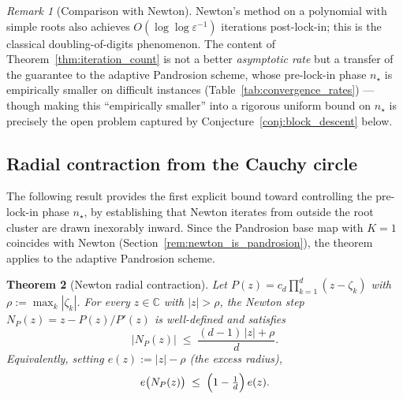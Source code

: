 \documentclass[10pt,a4paper,oneside]{book}
\newtheorem{theorem}{Theorem}[chapter]
\theoremstyle{definition}
\theoremstyle{remark}
\newtheorem{remark}[theorem]{Remark}
\newcommand{\CC}{\mathbb{C}}
\begin{document}
\begin{remark}[Comparison with Newton]
Newton's method on a polynomial with simple roots also achieves $O(\log\log \varepsilon^{-1})$ iterations post-lock-in; this is the classical doubling-of-digits phenomenon.  The content of Theorem~\ref{thm:iteration_count} is not a better \emph{asymptotic rate} but a transfer of the guarantee to the adaptive Pandrosion scheme, whose pre-lock-in phase $n_\star$ is empirically smaller on difficult instances (Table~\ref{tab:convergence_rates}) --- though making this ``empirically smaller'' into a rigorous uniform bound on $n_\star$ is precisely the open problem captured by Conjecture~\ref{conj:block_descent} below.
\end{remark}

\subsection{Radial contraction from the Cauchy circle}
\label{sec:radial_contraction}

The following result provides the first explicit bound toward controlling the pre-lock-in phase $n_\star$, by establishing that Newton iterates from outside the root cluster are drawn inexorably inward.  Since the Pandrosion base map with $K = 1$ coincides with Newton (Section~\ref{rem:newton_is_pandrosion}), the theorem applies to the adaptive Pandrosion scheme.

\begin{theorem}[Newton radial contraction]
\label{thm:radial_contraction}
Let $P(z) = c_d\prod_{k=1}^d (z - \zeta_k)$ with $\rho := \max_k |\zeta_k|$.  For every $z \in \CC$ with $|z| > \rho$, the Newton step $N_P(z) = z - P(z)/P'(z)$ is well-defined and satisfies
\begin{equation}
  \label{eq:radial_bound}
  |N_P(z)| \;\leq\; \frac{(d-1)\,|z| + \rho}{d}.
\end{equation}
Equivalently, setting $e(z) := |z| - \rho$ (the \emph{excess radius}),
\begin{equation}
  \label{eq:excess_contraction}
  e\bigl(N_P(z)\bigr) \;\leq\; \Bigl(1 - \tfrac{1}{d}\Bigr)\, e(z).
\end{equation}
\end{theorem}
\end{document}
